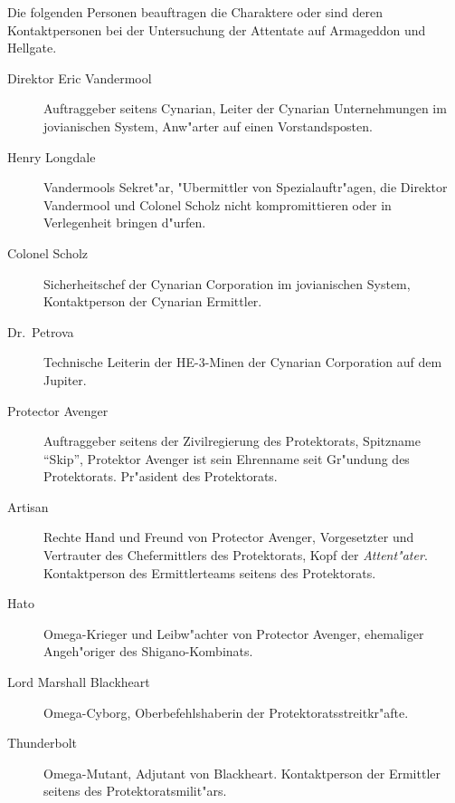 
Die folgenden Personen beauftragen die Charaktere oder sind deren Kontaktpersonen bei der Untersuchung der Attentate auf Armageddon und Hellgate.


\begin{description}
    \item [Direktor Eric Vandermool] Auftraggeber seitens Cynarian, Leiter der Cynarian Unternehmungen im jovianischen System, Anw"arter auf 
        einen Vorstandsposten.
    \item [Henry Longdale] Vandermools Sekret"ar, "Ubermittler von Spezialauftr"agen, die Direktor Vandermool und Colonel Scholz nicht 
        kompromittieren oder in Verlegenheit bringen d"urfen.
    \item [Colonel Scholz] Sicherheitschef der Cynarian Corporation im jovianischen System, Kontaktperson der Cynarian Ermittler.
    \item [Dr.~Petrova] Technische Leiterin der HE-3-Minen der Cynarian Corporation auf dem Jupiter.
\end{description}


\begin{description}
    \item [Protector Avenger] Auftraggeber seitens der Zivilregierung des Protektorats, Spitzname "`Skip"', Protektor Avenger ist sein 
        Ehrenname seit Gr"undung des Protektorats. Pr"asident des Protektorats.
    \item [Artisan] Rechte Hand und Freund von Protector Avenger, Vorgesetzter und Vertrauter des Chefermittlers des Protektorats, Kopf der 
        \emph{Attent"ater}. Kontaktperson des Ermittlerteams seitens des Protektorats.
    \item [Hato] Omega-Krieger und Leibw"achter von Protector Avenger, ehemaliger Angeh"origer des Shigano-Kombinats.
    \item [Lord Marshall Blackheart] Omega-Cyborg, Oberbefehlshaberin der Protektoratsstreitkr"afte.
    \item [Thunderbolt] Omega-Mutant, Adjutant von Blackheart. Kontaktperson der Ermittler seitens des Protektoratsmilit"ars.
\end{description}
